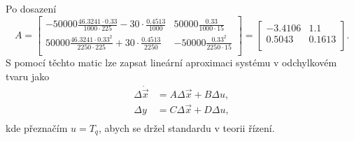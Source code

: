 \documentclass[twoside]{article}
\begin{document}
Po dosazení
\begin{equation}
	A = \begin{bmatrix}
		-50000 \frac{46.3241 \cdot 0.33}{1000 \cdot 225} - 30 \cdot \frac{0.4513}{1000} & 50000 \frac{0.33}{1000 \cdot 15} \\
		50000 \frac{46.3241 \cdot 0.33^2}{2250 \cdot 225} + 30 \cdot \frac{0.4513}{2250} & -50000 \frac{0.33^2}{2250 \cdot 15} \\
	\end{bmatrix} = \begin{bmatrix}
		-3.4106 & 1.1 \\
		0.5043 & 0.1613 \\
	\end{bmatrix}.
\end{equation}
S pomocí těchto matic lze zapsat lineární aproximaci systému v odchylkovém tvaru jako
\begin{equation}
	\begin{split}
		\Delta \dot{\vec{x}} &= A \Delta \vec{x} + B \Delta u, \\
		\Delta y &= C \Delta\vec{x} + D \Delta u, \\
	\end{split}
\end{equation}
kde přeznačím $u = T_q$, abych se držel standardu v teorii řízení.
	
\end{document}
